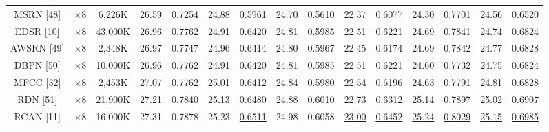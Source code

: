 \documentclass{ieeeaccess}
\begin{document}
\begin{table}
\begin{tabular}{|c|c|c|cc|cc|cc|cc|cc|cc|}
MSRN [48]& $\times8$&6,226K& \multicolumn{1}{c|}{26.59} &  0.7254 & \multicolumn{1}{c|}{24.88} & 0.5961&\multicolumn{1}{c|}{24.70} & 0.5610 & \multicolumn{1}{c|}{22.37 } & 0.6077 & \multicolumn{1}{c|}{24.30 } &0.7701 &\multicolumn{1}{c|}{24.56  } &  0.6520       \\

EDSR [10]& $\times8$&43,000K& \multicolumn{1}{c|}{26.96} &  0.7762 & \multicolumn{1}{c|}{24.91} & 0.6420&\multicolumn{1}{c|}{24.81} & 0.5985 & \multicolumn{1}{c|}{22.51  } &0.6221 & \multicolumn{1}{c|}{24.69 } &0.7841
&\multicolumn{1}{c|}{24.74  } &  0.6824       \\

AWSRN [49]& $\times8$&2,348K& \multicolumn{1}{c|}{26.97} &  0.7747 & \multicolumn{1}{c|}{24.96} & 0.6414&\multicolumn{1}{c|}{24.80} & 0.5967 & \multicolumn{1}{c|}{22.45  } &0.6174 & \multicolumn{1}{c|}{24.69 } &0.7842 &\multicolumn{1}{c|}{24.77  } &  0.6828       \\

DBPN [50]& $\times8$&10,000K& \multicolumn{1}{c|}{26.96} &  0.7762 & \multicolumn{1}{c|}{24.91} & 0.6420&\multicolumn{1}{c|}{24.81} & 0.5985 & \multicolumn{1}{c|}{22.51  } &0.6221 & \multicolumn{1}{c|}{24.60 } &0.7732
&\multicolumn{1}{c|}{24.75  } &  0.6824       \\

MFCC [32]& $\times8$&2,453K& \multicolumn{1}{c|}{27.07} &  0.7762 & \multicolumn{1}{c|}{25.01} & 0.6412&\multicolumn{1}{c|}{24.84} & 0.5980 & \multicolumn{1}{c|}{22.54  } &0.6196 & \multicolumn{1}{c|}{24.63 } &0.7791 &\multicolumn{1}{c|}{24.81  } &  0.6828       \\

RDN [51]& $\times8$&21,900K& \multicolumn{1}{c|}{27.21} &  0.7840 & \multicolumn{1}{c|}{25.13} & 0.6480&\multicolumn{1}{c|}{24.88} & 0.6010 & \multicolumn{1}{c|}{22.73  } &0.6312 & \multicolumn{1}{c|}{25.14 } &0.7897 &\multicolumn{1}{c|}{25.02  } &  0.6907       \\

RCAN [11]& $\times8$&16,000K& \multicolumn{1}{c|}{27.31} &  0.7878 & \multicolumn{1}{c|}{25.23} & {\color{blue}\underline{0.6511}}&\multicolumn{1}{c|}{24.98} & 0.6058 & \multicolumn{1}{c|}{\color{blue}\underline{23.00}} &{\color{blue}\underline{0.6452}} & \multicolumn{1}{c|}{\color{blue}\underline{25.24 }} &{\color{blue}\underline{0.8029}}
&\multicolumn{1}{c|}{\color{blue}\underline{25.15}} &  {\color{blue}\underline{0.6985}}       \\


\end{tabular}
\end{table}
\end{document}
